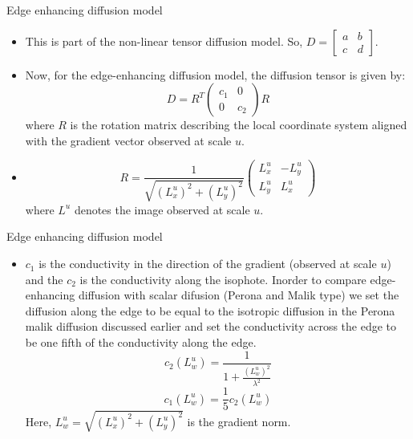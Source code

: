 \documentclass{beamer}
\begin{document}
\begin{frame}{Edge enhancing diffusion model}
  \begin{itemize}
  \item {
    This is part of the non-linear tensor diffusion model. So, $D=\left[\begin{array}{cc}
a & b\\
c & d
\end{array}\right]$.
    \pause %
  }
  \item {   
    Now, for the edge-enhancing diffusion model, the diffusion tensor is given by: 
\[
D=R^{T}\left(\begin{array}{cc}
c_{1} & 0\\
0 & c_{2}
\end{array}\right)R
\]
 where $R$ is the rotation matrix describing the local coordinate system aligned with the gradient vector observed at scale $u$.
    \pause
  }
  \item<3-> {
    \[
R=\frac{1}{\sqrt{\left(L_{x}^{u}\right)^{2}+\left(L_{y}^{u}\right)^{2}}}\left(\begin{array}{cc}
L_{x}^{u} & -L_{y}^{u}\\
L_{y}^{u} & L_{x}^{u}
\end{array}\right)
\]
where $L^{u}$ denotes the image observed at scale $u$.
  }
  \end{itemize}
\end{frame}

\begin{frame}{Edge enhancing diffusion model}
  \begin{itemize}
  \item{$c_{1}$ is the conductivity in the direction of the gradient (observed at scale $u$) and the $c_{2}$ is the conductivity along the isophote. Inorder to compare edge-enhancing diffusion with scalar difusion (Perona and Malik type) we set the diffusion along the edge to be equal to the isotropic diffusion in the Perona malik diffusion discussed earlier and set the conductivity across the edge to be one fifth of the conductivity along the edge. \[c_{2}\left(L_{w}^{u}\right)=\frac{1}{1+\frac{\left(L_{w}^{u}\right)^{2}}{\lambda^{2}}}\]
\[c_{1}\left(L_{w}^{u}\right)=\frac{1}{5}c_{2}\left(L_{w}^{u}\right)\] Here, $L_{w}^{u}=\sqrt{\left(L_{x}^{u}\right)^{2}+\left(L_{y}^{u}\right)^{2}}$ is the gradient norm.}
  \end{itemize}
\end{frame}
\end{document}
